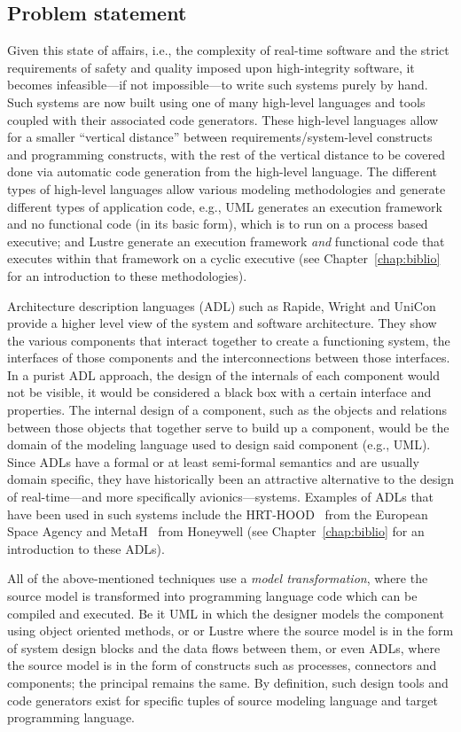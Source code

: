 \subsection{Problem statement}
Given this state of affairs, i.e., the complexity of real-time
software and the strict requirements of safety and quality imposed
upon high-integrity software, it becomes infeasible---if not
impossible---to write such systems purely by hand. Such systems are
now built using one of many high-level languages and tools coupled
with their associated code generators. These high-level languages
allow for a smaller ``vertical distance'' between
requirements/system-level constructs and programming constructs, with
the rest of the vertical distance to be covered done via automatic
code generation from the high-level language. The different types of
high-level languages allow various modeling methodologies and generate
different types of application code, e.g., UML generates an execution
framework and no functional code (in its basic form), which is to run
on a process based executive; \simu and Lustre generate
an execution framework \emph{and} functional code that executes within
that framework on a cyclic executive (see Chapter~\ref{chap:biblio}
for an introduction to these methodologies).

Architecture description languages (ADL) such as Rapide, Wright and
UniCon~\cite{clements@iwssd96} provide a higher level view of the
system and software architecture. They show the various components
that interact together to create a functioning system, the interfaces
of those components and the interconnections between those
interfaces. In a purist ADL approach, the design of the internals of
each component would not be visible, it would be considered a black
box with a certain interface and properties. The internal design of a
component, such as the objects and relations between those objects
that together serve to build up a component, would be the domain of
the modeling language used to design said component (e.g., UML). Since
ADLs have a formal or at least semi-formal semantics and are usually
domain specific, they have historically been an attractive alternative
to the design of real-time---and more specifically
avionics---systems. Examples of ADLs that have been used in such
systems include the HRT-HOOD~\cite{burns@rts94} from the European
Space Agency and MetaH~\cite{metah-manual} from Honeywell (see
Chapter~\ref{chap:biblio} for an introduction to these ADLs).

All of the above-mentioned techniques use a \emph{model
  transformation}, where the source model is transformed into
programming language code which can be compiled and executed. Be it
UML in which the designer models the component using object oriented
methods, or \simu or Lustre where the source model is in the form of
system design blocks and the data flows between them, or even ADLs,
where the source model is in the form of constructs such as processes,
connectors and components; the principal remains the same. By
definition, such design tools and code generators exist for specific
tuples of source modeling language and target programming language.

